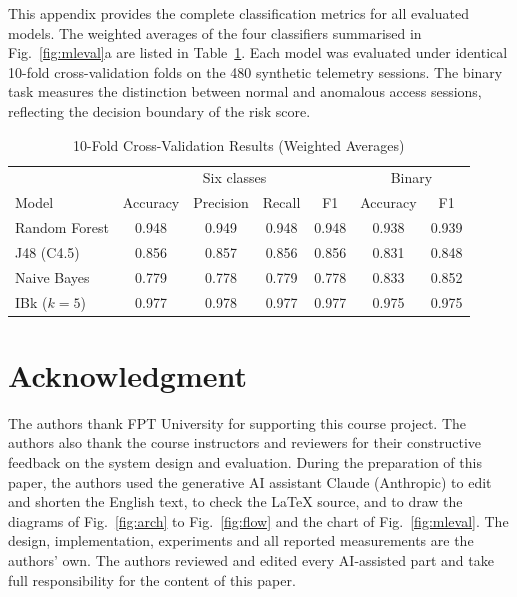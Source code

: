 
This appendix provides the complete classification metrics for all evaluated models. The weighted averages of the four
classifiers summarised in Fig.~\ref{fig:mleval}a are listed in Table~\ref{tab:ml}. Each model was evaluated under
identical 10-fold cross-validation folds on the 480 synthetic telemetry sessions. The binary task measures the
distinction between normal and anomalous access sessions, reflecting the decision boundary of the risk score.

\begin{table}[!htbp]
\renewcommand{\arraystretch}{1.1}
\centering
\small
\caption{10-Fold Cross-Validation Results (Weighted Averages)}
\label{tab:ml}
\begin{tabular}{l c c c c c c}
\hline
 & \multicolumn{4}{c}{Six classes} & \multicolumn{2}{c}{Binary} \\
Model & Accuracy & Precision & Recall & F1 & Accuracy & F1 \\
\hline
Random Forest & 0.948 & 0.949 & 0.948 & 0.948 & 0.938 & 0.939 \\
J48 (C4.5)    & 0.856 & 0.857 & 0.856 & 0.856 & 0.831 & 0.848 \\
Naive Bayes   & 0.779 & 0.778 & 0.779 & 0.778 & 0.833 & 0.852 \\
IBk ($k=5$)   & 0.977 & 0.978 & 0.977 & 0.977 & 0.975 & 0.975 \\
\hline
\end{tabular}
\end{table}

\section*{Acknowledgment}

The authors thank FPT University for supporting this course project. The authors also thank the course instructors and
reviewers for their constructive feedback on the system design and evaluation. During the preparation of this paper,
the authors used the generative AI assistant Claude (Anthropic) to edit and shorten the English text, to check the
\LaTeX{} source, and to draw the diagrams of Fig.~\ref{fig:arch} to Fig.~\ref{fig:flow} and the chart of
Fig.~\ref{fig:mleval}. The design, implementation, experiments and all reported measurements are the authors' own.
The authors reviewed and edited every AI-assisted part and take full responsibility for the content of this paper.





